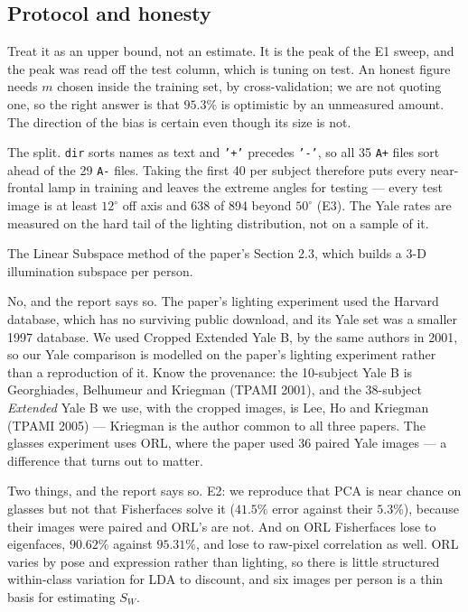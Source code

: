 \documentclass[11pt]{article}
\begin{document}
\subsection{Protocol and honesty}
\begin{description}[style=nextline,leftmargin=0pt]
\item[Is $95.3\%$ your real ORL accuracy?] Treat it as an upper bound, not an
  estimate. It is the peak of the E1 sweep, and the peak was read off the test
  column, which is tuning on test. An honest figure needs $m$ chosen inside the
  training set, by cross-validation; we are not quoting one, so the right answer
  is that $95.3\%$ is optimistic by an unmeasured amount. The direction of the
  bias is certain even though its size is not.
\item[Why are the Yale numbers so low?] The split. \texttt{dir} sorts names as
  text and \texttt{'+'} precedes \texttt{'-'}, so all 35 \texttt{A+} files sort
  ahead of the 29 \texttt{A-} files. Taking the first 40 per subject therefore
  puts every near-frontal lamp in training and leaves the extreme angles for
  testing --- every test image is at least $12^\circ$ off axis and 638 of 894
  beyond $50^\circ$ (E3). The Yale rates are measured on the hard tail of the
  lighting distribution, not on a sample of it.
\item[What did you not implement?] The Linear Subspace method of the paper's
  Section 2.3, which builds a 3-D illumination subspace per person.
\item[Did you use the paper's databases?] No, and the report says so. The
  paper's lighting experiment used the Harvard database, which has no surviving
  public download, and its Yale set was a smaller 1997 database. We used
  Cropped Extended Yale B, by the same authors in 2001, so our Yale comparison
  is modelled on the paper's lighting experiment rather than a reproduction of
  it. Know the provenance: the 10-subject Yale B is Georghiades, Belhumeur and
  Kriegman (TPAMI 2001), and the 38-subject \emph{Extended} Yale B we use, with
  the cropped images, is Lee, Ho and Kriegman (TPAMI 2005) --- Kriegman is the
  author common to all three papers. The glasses experiment uses ORL, where the
  paper used 36 paired Yale images --- a difference that turns out to matter.
\item[Anything that did not come out as the paper says?] Two things, and the
  report says so. E2: we reproduce that PCA is near chance on glasses but not
  that Fisherfaces solve it ($41.5\%$ error against their $5.3\%$), because
  their images were paired and ORL's are not. And on ORL Fisherfaces lose to
  eigenfaces, $90.62\%$ against $95.31\%$,
  and lose to raw-pixel correlation as well. ORL varies by pose and expression
  rather than lighting, so there is little structured within-class variation for
  LDA to discount, and six images per person is a thin basis for estimating
  $S_W$.
\end{description}
\end{document}
